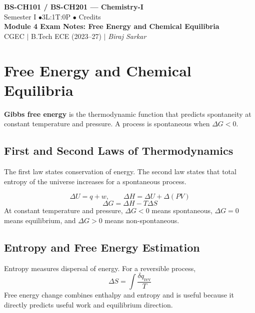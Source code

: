 \documentclass[12pt,a4paper]{article}
\begin{document}
\begin{center}
  {\LARGE\bfseries\color{myred} BS-CH101 / BS-CH201 --- Chemistry-I}\\[5pt]
  {\normalsize\color{mydark} Semester I \quad$\bullet$\quad 3L:1T:0P \quad$\bullet$ Credits}\\[3pt]
  {\normalsize\color{myteal}\textbf{Module 4 Exam Notes: Free Energy and Chemical Equilibria}}\\[3pt]
  {\small\color{mydark} CGEC \;$|$\; B.Tech ECE (2023--27) \;$|$\; \textit{Biraj Sarkar}}
\end{center}
\vspace{2pt}
\noindent{\color{myred}\rule{\linewidth}{1.5pt}}
\vspace{2pt}

\hypersetup{linkcolor=mydark}
\tableofcontents
\hypersetup{linkcolor=myteal}
\newpage
\section{Free Energy and Chemical Equilibria}

\begin{tcolorbox}[defbox]
\textbf{Gibbs free energy} is the thermodynamic function that predicts spontaneity at constant temperature and pressure. A process is spontaneous when $\Delta G<0$.
\end{tcolorbox}

\subsection{First and Second Laws of Thermodynamics}
The first law states conservation of energy. The second law states that total entropy of the universe increases for a spontaneous process.

\begin{tcolorbox}[formulabox, title={Thermodynamic Functions}]
\[
\Delta U=q+w,\qquad \Delta H=\Delta U+\Delta(PV)
\]
\[
\Delta G=\Delta H-T\Delta S
\]
At constant temperature and pressure, $\Delta G<0$ means spontaneous, $\Delta G=0$ means equilibrium, and $\Delta G>0$ means non-spontaneous.
\end{tcolorbox}

\subsection{Entropy and Free Energy Estimation}
Entropy measures dispersal of energy. For a reversible process,
\[
\Delta S=\int\frac{\delta q_{\mathrm{rev}}}{T}
\]
Free energy change combines enthalpy and entropy and is useful because it directly predicts useful work and equilibrium direction.
\end{document}

